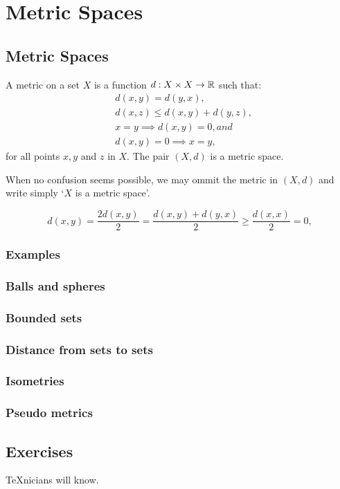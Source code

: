 \chapter{Metric Spaces}\label{chp:metric-spaces}

\section{Metric Spaces}\label{sec:metric-spaces}

\begin{definition}
  A metric on a set \(X\) is a function \(d:X\times{X}\to\mathbb{R}\) such that:
  \begin{align}
      & d(x,y)=d(y,x),                  \label{axiom:metric-space-01} \\
      & d(x,z)\leqslant{d(x,y)+d(y,z)}, \label{axiom:metric-space-02} \\
      & x=y\implies{d(x,y)=0}, and      \label{axiom:metric-space-03} \\
      & d(x,y)=0\implies{x=y},          \label{axiom:metric-space-04}
  \end{align}
  for all points \(x,y\) and \(z\) in \(X\). The pair \((X,d)\) is a metric
  space.
\end{definition}

When no confusion seems possible, we may ommit the metric in \((X,d)\) and
write simply `\(X\) is a metric space'.

\[
  d(x,y)
  =
  \frac{2d(x,y)}{2}
  =
  \frac{d(x,y)+d(y,x)}{2}
  \geqslant
  \frac{d(x,x)}{2}
  =
  0,
\]

\subsection{Examples}

\subsection{Balls and spheres}

\subsection{Bounded sets}

\subsection{Distance from sets to sets}

\subsection{Isometries}

\subsection{Pseudo metrics}

\section{Exercises}

\begin{exercise}
  \TeX{}nicians will know.
\end{exercise}
